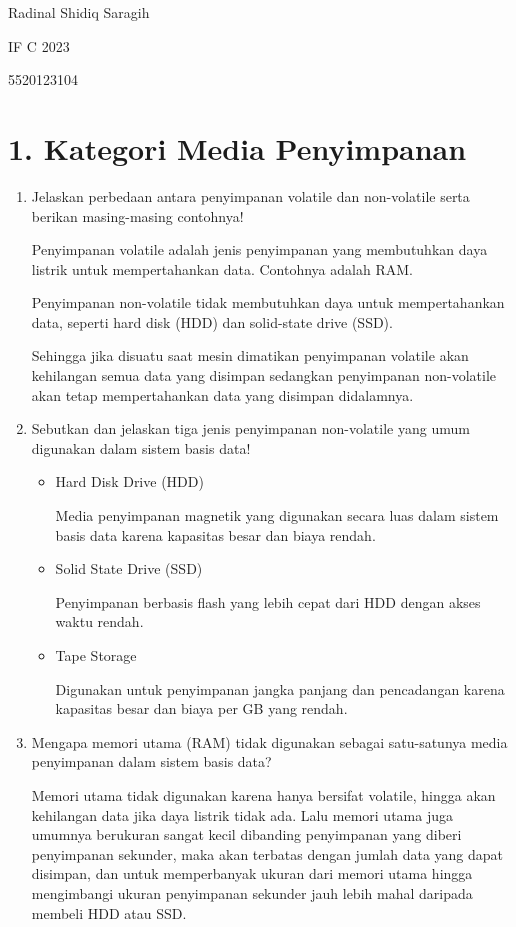 \documentclass[a4paper,11pt]{article}
\date{}
\begin{document}
Radinal Shidiq Saragih

IF C 2023

5520123104

\section*{1. Kategori Media Penyimpanan}
\begin{enumerate}[label=\alph*.]
    \item Jelaskan perbedaan antara penyimpanan volatile dan non-volatile serta berikan masing-masing contohnya!

      Penyimpanan volatile adalah jenis penyimpanan yang membutuhkan daya
      listrik untuk mempertahankan data. Contohnya adalah RAM.

      Penyimpanan non-volatile tidak membutuhkan daya untuk mempertahankan
      data, seperti hard disk (HDD) dan solid-state drive (SSD).

      Sehingga jika disuatu saat mesin dimatikan penyimpanan volatile akan
      kehilangan semua data yang disimpan sedangkan penyimpanan non-volatile
      akan tetap mempertahankan data yang disimpan didalamnya.

    \item Sebutkan dan jelaskan tiga jenis penyimpanan non-volatile yang umum digunakan dalam sistem basis data!

      \begin{itemize}
        \item Hard Disk Drive (HDD)

          Media penyimpanan magnetik yang digunakan secara luas dalam sistem basis data karena kapasitas besar dan biaya rendah.

        \item Solid State Drive (SSD)

          Penyimpanan berbasis flash yang lebih cepat dari HDD dengan akses waktu rendah.

        \item Tape Storage 

          Digunakan untuk penyimpanan jangka panjang dan pencadangan karena kapasitas besar dan biaya per GB yang rendah.

      \end{itemize}


    \item Mengapa memori utama (RAM) tidak digunakan sebagai satu-satunya media penyimpanan dalam sistem basis data?

      Memori utama tidak digunakan karena hanya bersifat volatile, hingga akan
      kehilangan data jika daya listrik tidak ada. Lalu memori utama juga umumnya
      berukuran sangat kecil dibanding penyimpanan yang diberi penyimpanan sekunder,
      maka akan terbatas dengan jumlah data yang dapat disimpan, dan untuk memperbanyak
      ukuran dari memori utama hingga mengimbangi ukuran penyimpanan sekunder 
      jauh lebih mahal daripada membeli HDD atau SSD.

\end{enumerate}
\end{document}
